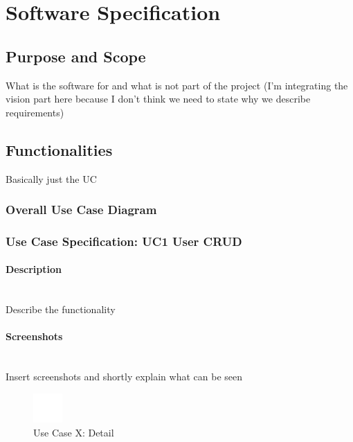 \newpage
\section{Software Specification}
\label{sec:domainB}

\subsection{Purpose and Scope}
\label{sec:domainBa}
What is the software for and what is not part of the project (I'm integrating the vision part here because I don't think we need to state why we describe requirements)

\subsection{Functionalities}
\label{sec:domainBb}
Basically just the \ac{UC}

\subsubsection{Overall Use Case Diagram}
\label{sec:domainBba}


\newpage
\subsubsection{Use Case Specification: \ac{UC}1 User CRUD}
\label{sec:domainBbb}

\paragraph*{Description}\mbox{}\\
Describe the functionality

\paragraph*{Screenshots}\mbox{}\\
Insert screenshots and shortly explain what can be seen
\begin{figure}[h] 
	\centering
	\includegraphics[width=0.1\textwidth]{Content/Domain/placeholder.png}
	\caption{Use Case X: Detail}
	\label{fig:useCaseXDetailY}
\end{figure}

